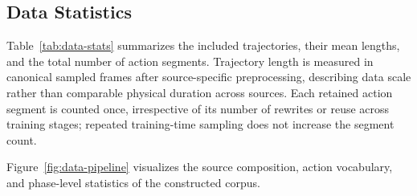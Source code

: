 \hypertarget{data-statistics}{%
\subsection{Data Statistics}\label{data-statistics}}

%

Table~\ref{tab:data-stats} summarizes the included trajectories, their mean
lengths, and the total number of action segments. Trajectory length is measured
in canonical sampled frames after source-specific preprocessing, describing data
scale rather than comparable physical duration across sources. Each retained
action segment is counted once, irrespective of its number of rewrites or reuse
across training stages; repeated training-time sampling does not increase the
segment count.

Figure~\ref{fig:data-pipeline} visualizes the source composition, action vocabulary, and
phase-level statistics of the constructed corpus.

%

